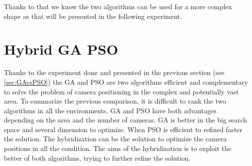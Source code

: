 Thanks to that we know the two algorithms can be used for a more complex shape as that will be presented in the following experiment.

 







\section{Hybrid GA PSO }
 

Thanks to the experiment done and presented in the previous section (see \ref{sec:GAvsPSO}) the GA and PSO are two algorithms efficient and complementary to solve the problem of camera positioning in the complex and potentially vast area.
  To summarize the previous comparison, it is difficult to rank the two algorithms in all the environments. GA and PSO have both advantages depending on the area and the number of cameras. GA is better in the big search space and several dimension to optimize. When PSO is efficient to refined faster the solution.
 The hybridization can be the solution to optimize the camera positions in all the condition. The aims of the hybridization is to exploit the better of both algorithms, trying to further refine the solution. 


